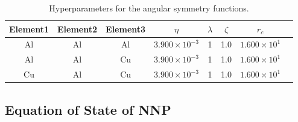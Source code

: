 \documentclass{article}
\renewcommand{\arraystretch}{1.5}
\begin{document}
\begin{table}[H]
\caption{Hyperparameters for the angular symmetry functions.}
\centering
\vspace{1em}
\bgroup
\def\arraystretch{1.2}
\begin{tabular}{cccccccc}
\hline
Element1 & Element2 & Element3 & $\eta$ & $\lambda$ & $\zeta$ & $r_c$\\
\hline
\hline
Al &  Al &  Al & $3.900 \times 10^{-3}$ &  1 &  1.0 & $1.600 \times 10^{1}$ \\
Al &  Al &  Cu & $3.900 \times 10^{-3}$ &  1 &  1.0 & $1.600 \times 10^{1}$ \\
Cu &  Al &  Cu & $3.900 \times 10^{-3}$ &  1 &  1.0 & $1.600 \times 10^{1}$ \\
\hline
\end{tabular}
\label{table:symfunc_angular_hypers}
\egroup
\end{table}

%


\subsection{Equation of State of NNP} \label{apd_sct:eos_data}
\end{document}
